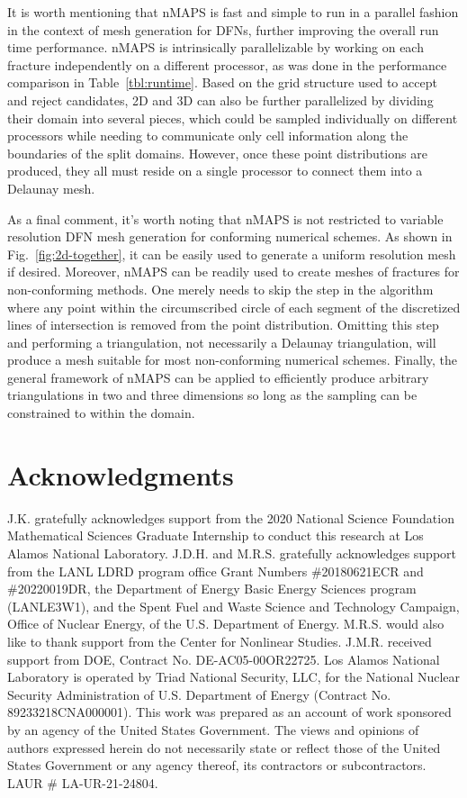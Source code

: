 \documentclass[preprint, 10pt]{elsarticle}
\theoremstyle{definition}
\theoremstyle{remark}
\begin{document}
It is worth mentioning that nMAPS is fast and simple to run in a parallel fashion in the context of mesh generation for DFNs, further improving the overall run time performance. 
nMAPS is intrinsically parallelizable by working on each fracture independently on a different processor, as was done in the performance comparison in Table~\ref{tbl:runtime}.
Based on the grid structure used to accept and reject candidates, 2D and 3D can also be further parallelized by dividing their domain into several pieces, which could be sampled individually on different processors while needing to communicate only cell information along the boundaries of the split domains. 
However, once these point distributions are produced, they all must reside on a single processor to connect them into a Delaunay mesh.

As a final comment, it's worth noting that nMAPS is not restricted to variable resolution DFN mesh generation for conforming numerical schemes.
As shown in Fig.~\ref{fig:2d-together}, it can be easily used to generate a uniform resolution mesh if desired. 
Moreover, nMAPS can be readily used to create meshes of fractures for non-conforming methods. 
One merely needs to skip the step in the algorithm where any point within the circumscribed circle of each segment of the discretized lines of intersection is removed from the point distribution. 
Omitting this step and performing a triangulation, not necessarily a Delaunay triangulation, will produce a mesh suitable for most non-conforming numerical schemes.
Finally, the general framework of nMAPS can be applied to efficiently produce arbitrary triangulations in two and three dimensions so long as the sampling can be constrained to within the domain. 

\section{Acknowledgments}
J.K. gratefully acknowledges support from the 2020 National Science Foundation
Mathematical Sciences Graduate Internship to conduct this research at Los Alamos National Laboratory.
J.D.H. and M.R.S. gratefully acknowledges support from the LANL LDRD program office Grant Numbers \#20180621ECR and \#20220019DR, the Department of Energy Basic Energy Sciences program (LANLE3W1), and the Spent Fuel and Waste Science and Technology Campaign, Office of Nuclear Energy, of the U.S. Department of Energy. 
M.R.S. would also like to thank support from the Center for Nonlinear Studies.
J.M.R. received support from DOE,  Contract No. DE-AC05-00OR22725. 
Los Alamos National Laboratory is operated by Triad National Security, LLC, for the National Nuclear Security Administration of U.S. Department of Energy (Contract No. 89233218CNA000001).
This work was prepared as an account of work sponsored by an agency of the United States Government.
The views and opinions of authors expressed herein do not necessarily state or reflect those of the United States Government or any agency thereof, its contractors or subcontractors.
LAUR \# LA-UR-21-24804.
\end{document}
